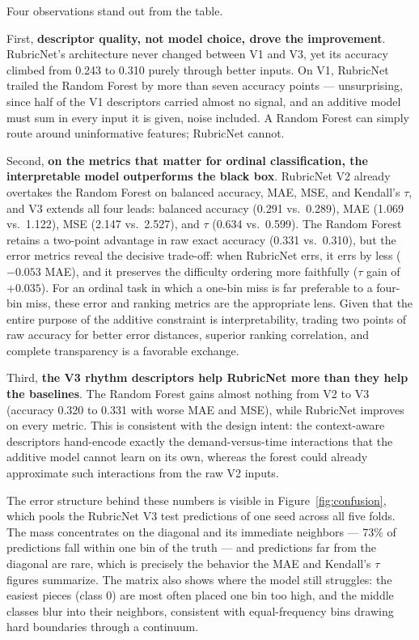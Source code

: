 Four observations stand out from the table.

First, \textbf{descriptor quality, not model choice, drove the improvement}. RubricNet's architecture never changed between V1 and V3, yet its accuracy climbed from 0.243 to 0.310 purely through better inputs. On V1, RubricNet trailed the Random Forest by more than seven accuracy points --- unsurprising, since half of the V1 descriptors carried almost no signal, and an additive model must sum in every input it is given, noise included. A Random Forest can simply route around uninformative features; RubricNet cannot.

Second, \textbf{on the metrics that matter for ordinal classification, the interpretable model outperforms the black box}. RubricNet V2 already overtakes the Random Forest on balanced accuracy, MAE, MSE, and Kendall's $\tau$, and V3 extends all four leads: balanced accuracy (0.291 vs.\ 0.289), MAE (1.069 vs.\ 1.122), MSE (2.147 vs.\ 2.527), and $\tau$ (0.634 vs.\ 0.599). The Random Forest retains a two-point advantage in raw exact accuracy (0.331 vs.\ 0.310), but the error metrics reveal the decisive trade-off: when RubricNet errs, it errs by less ($-0.053$ MAE), and it preserves the difficulty ordering more faithfully ($\tau$ gain of $+0.035$). For an ordinal task in which a one-bin miss is far preferable to a four-bin miss, these error and ranking metrics are the appropriate lens. Given that the entire purpose of the additive constraint is interpretability, trading two points of raw accuracy for better error distances, superior ranking correlation, and complete transparency is a favorable exchange.

Third, \textbf{the V3 rhythm descriptors help RubricNet more than they help the baselines}. The Random Forest gains almost nothing from V2 to V3 (accuracy 0.320 to 0.331 with worse MAE and MSE), while RubricNet improves on every metric. This is consistent with the design intent: the context-aware descriptors hand-encode exactly the demand-versus-time interactions that the additive model cannot learn on its own, whereas the forest could already approximate such interactions from the raw V2 inputs.

The error structure behind these numbers is visible in Figure~\ref{fig:confusion}, which pools the RubricNet V3 test predictions of one seed across all five folds. The mass concentrates on the diagonal and its immediate neighbors --- 73\% of predictions fall within one bin of the truth --- and predictions far from the diagonal are rare, which is precisely the behavior the MAE and Kendall's $\tau$ figures summarize. The matrix also shows where the model still struggles: the easiest pieces (class 0) are most often placed one bin too high, and the middle classes blur into their neighbors, consistent with equal-frequency bins drawing hard boundaries through a continuum.

